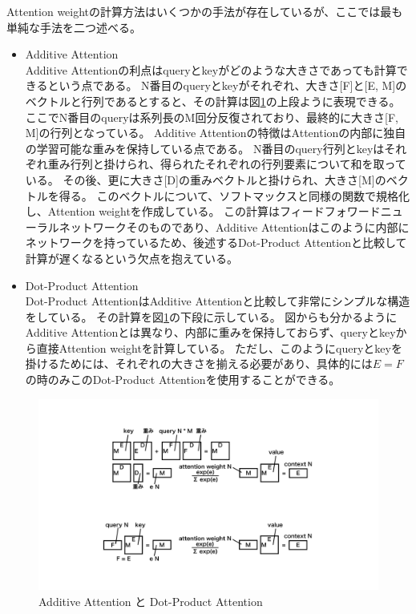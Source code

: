 Attention weightの計算方法はいくつかの手法が存在しているが、ここでは最も単純な手法を二つ述べる。
\begin{itemize}
  \item Additive Attention\cite{BahdanauAttention}\\
  Additive Attentionの利点はqueryとkeyがどのような大きさであっても計算できるという点である。
  N番目のqueryとkeyがそれぞれ、大きさ[F]と[E, M]のベクトルと行列であるとすると、その計算は図\ref{20Attention}の上段ように表現できる。
  ここでN番目のqueryは系列長のM回分反復されており、最終的に大きさ[F, M]の行列となっている。
  Additive Attentionの特徴はAttentionの内部に独自の学習可能な重みを保持している点である。
  N番目のquery行列とkeyはそれぞれ重み行列と掛けられ、得られたそれぞれの行列要素について和を取っている。
  その後、更に大きさ[D]の重みベクトルと掛けられ、大きさ[M]のベクトルを得る。
  このベクトルについて、ソフトマックスと同様の関数で規格化し、Attention weightを作成している。
  この計算はフィードフォワードニューラルネットワークそのものであり、Additive Attentionはこのように内部にネットワークを持っているため、後述するDot-Product Attentionと比較して計算が遅くなるという欠点を抱えている。

  \item Dot-Product Attention\cite{LuongAttention}\\
  Dot-Product AttentionはAdditive Attentionと比較して非常にシンプルな構造をしている。
  その計算を図\ref{20Attention}の下段に示している。
  図からも分かるようにAdditive Attentionとは異なり、内部に重みを保持しておらず、queryとkeyから直接Attention weightを計算している。
  ただし、このようにqueryとkeyを掛けるためには、それぞれの大きさを揃える必要があり、具体的には$E=F$の時のみこのDot-Product Attentionを使用することができる。
\end{itemize}
  
\begin{figure}[h]
 \centering
 \includegraphics[trim = 200 100 200 100, width=1.0\textwidth, clip]{Figure/2DeepLearning/20Attention.png}
 \caption{Additive Attention と Dot-Product Attention}
 \label{20Attention}
\end{figure}

